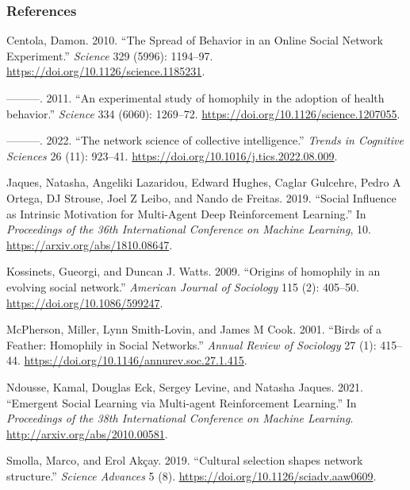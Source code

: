 \documentclass[
  letterpaper,
  DIV=11,
  numbers=noendperiod]{scrartcl}
\newlength{\cslhangindent}
\newenvironment{CSLReferences}[2] %
 {\begin{list}{}{%
  \setlength{\itemindent}{0pt}
  \setlength{\leftmargin}{0pt}
  \setlength{\parsep}{0pt}
  \ifodd #1
   \setlength{\leftmargin}{\cslhangindent}
   \setlength{\itemindent}{-1\cslhangindent}
  \fi
  \setlength{\itemsep}{#2\baselineskip}}}
 {\end{list}}
\begin{document}
\subsubsection*{References}\label{references}

\label{refs}
\begin{CSLReferences}{1}{0}
Centola, Damon. 2010. {``{The Spread of Behavior in an Online Social
Network Experiment}.''} \emph{Science} 329 (5996): 1194--97.
\url{https://doi.org/10.1126/science.1185231}.

---------. 2011. {``{An experimental study of homophily in the adoption
of health behavior}.''} \emph{Science} 334 (6060): 1269--72.
\url{https://doi.org/10.1126/science.1207055}.

---------. 2022. {``{The network science of collective intelligence}.''}
\emph{Trends in Cognitive Sciences} 26 (11): 923--41.
\url{https://doi.org/10.1016/j.tics.2022.08.009}.

Jaques, Natasha, Angeliki Lazaridou, Edward Hughes, Caglar Gulcehre,
Pedro A Ortega, DJ Strouse, Joel Z Leibo, and Nando de Freitas. 2019.
{``{Social Influence as Intrinsic Motivation for Multi-Agent Deep
Reinforcement Learning}.''} In \emph{Proceedings of the 36th
International Conference on Machine Learning}, 10.
\url{https://arxiv.org/abs/1810.08647}.

Kossinets, Gueorgi, and Duncan J. Watts. 2009. {``{Origins of homophily
in an evolving social network}.''} \emph{American Journal of Sociology}
115 (2): 405--50. \url{https://doi.org/10.1086/599247}.

McPherson, Miller, Lynn Smith-Lovin, and James M Cook. 2001. {``{Birds
of a Feather: Homophily in Social Networks}.''} \emph{Annual Review of
Sociology} 27 (1): 415--44.
\url{https://doi.org/10.1146/annurev.soc.27.1.415}.

Ndousse, Kamal, Douglas Eck, Sergey Levine, and Natasha Jaques. 2021.
{``{Emergent Social Learning via Multi-agent Reinforcement Learning}.''}
In \emph{Proceedings of the 38th International Conference on Machine
Learning}. \url{http://arxiv.org/abs/2010.00581}.

Smolla, Marco, and Erol Akçay. 2019. {``{Cultural selection shapes
network structure}.''} \emph{Science Advances} 5 (8).
\url{https://doi.org/10.1126/sciadv.aaw0609}.


\end{CSLReferences}
\end{document}
